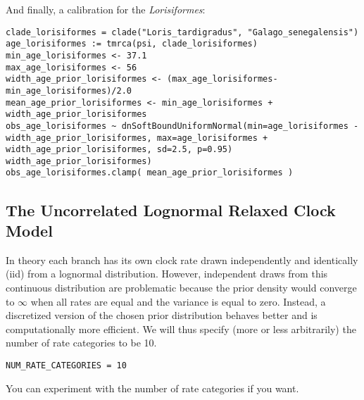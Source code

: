 And finally, a calibration for the \emph{Lorisiformes}:
{\tt \begin{snugshade*}
\begin{lstlisting}
clade_lorisiformes = clade("Loris_tardigradus", "Galago_senegalensis")
age_lorisiformes := tmrca(psi, clade_lorisiformes)
min_age_lorisiformes <- 37.1
max_age_lorisiformes <- 56
width_age_prior_lorisiformes <- (max_age_lorisiformes-min_age_lorisiformes)/2.0
mean_age_prior_lorisiformes <- min_age_lorisiformes + width_age_prior_lorisiformes
obs_age_lorisiformes ~ dnSoftBoundUniformNormal(min=age_lorisiformes - width_age_prior_lorisiformes, max=age_lorisiformes + width_age_prior_lorisiformes, sd=2.5, p=0.95)
width_age_prior_lorisiformes)
obs_age_lorisiformes.clamp( mean_age_prior_lorisiformes )
\end{lstlisting}
\end{snugshade*}}


\subsection{The Uncorrelated Lognormal Relaxed Clock Model}

In theory each branch has its own clock rate drawn independently and identically (iid) from a lognormal distribution.
However, independent draws from this continuous distribution are problematic because the prior density would converge to $\infty$ when all rates are equal and the variance is equal to zero.
Instead, a discretized version of the chosen prior distribution behaves better and is computationally more efficient.
We will thus specify (more or less arbitrarily) the number of rate categories to be 10.
{\tt \begin{snugshade*}
\begin{lstlisting}
NUM_RATE_CATEGORIES = 10
\end{lstlisting}
\end{snugshade*}}
You can experiment with the number of rate categories if you want.

